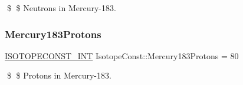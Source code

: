 \$ \$ Neutrons in Mercury-\/183. \mbox{\label{group___isotope_const-_mercury-_hg183_ga4236f975acc401862797ffebce4c72de}} 
\subsubsection{\texorpdfstring{Mercury183\+Protons}{Mercury183Protons}}
{\footnotesize\ttfamily \mbox{\hyperlink{group___isotope_const-_macros_ga5f18360b3e99483a35c32d789e62621c}{I\+S\+O\+T\+O\+P\+E\+C\+O\+N\+S\+T\+\_\+\+I\+NT}} Isotope\+Const\+::\+Mercury183\+Protons = 80}

\$ \$ Protons in Mercury-\/183. 